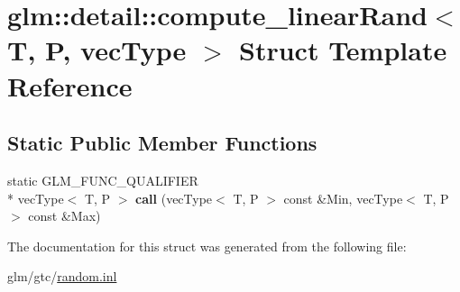 \hypertarget{structglm_1_1detail_1_1compute__linearRand}{\section{glm\-:\-:detail\-:\-:compute\-\_\-linear\-Rand$<$ T, P, vec\-Type $>$ Struct Template Reference}
\label{structglm_1_1detail_1_1compute__linearRand}
}
\subsection*{Static Public Member Functions}
\begin{DoxyCompactItemize}
\item 
\hypertarget{structglm_1_1detail_1_1compute__linearRand_a8eb63b699b38b830ef191d0ce323efd6}{static G\-L\-M\-\_\-\-F\-U\-N\-C\-\_\-\-Q\-U\-A\-L\-I\-F\-I\-E\-R \\*
vec\-Type$<$ T, P $>$ {\bfseries call} (vec\-Type$<$ T, P $>$ const \&Min, vec\-Type$<$ T, P $>$ const \&Max)}\label{structglm_1_1detail_1_1compute__linearRand_a8eb63b699b38b830ef191d0ce323efd6}

\end{DoxyCompactItemize}


The documentation for this struct was generated from the following file\-:\begin{DoxyCompactItemize}
\item 
glm/gtc/\hyperlink{random_8inl}{random.\-inl}\end{DoxyCompactItemize}
